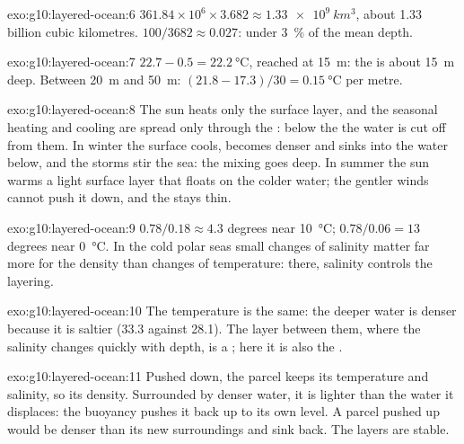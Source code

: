 \begin{solution}{exo:g10:layered-ocean:6}
$361.84\times10^6 \times 3.682 \approx \qty{1.33e9}{km^3}$, about
\num{1.33} billion cubic kilometres. $100/3682 \approx 0.027$: under
\qty{3}{\percent} of the mean depth.
\end{solution}

\begin{solution}{exo:g10:layered-ocean:7}
$22.7 - 0.5 = \qty{22.2}{\degreeCelsius}$, reached at \qty{15}{m}: the  is about \qty{15}{m} deep. Between \qty{20}{m} and \qty{50}{m}:
$(21.8 - 17.3)/30 = \qty{0.15}{\degreeCelsius}$ per metre.
\end{solution}

\begin{solution}{exo:g10:layered-ocean:8}
The sun heats only the surface layer, and the seasonal heating and cooling
are spread only through the : below the  the water is
cut off from them. In winter the surface cools, becomes denser and sinks into
the water below, and the storms stir the sea: the mixing goes deep. In summer
the sun warms a light surface layer that floats on the colder water; the
gentler winds cannot push it down, and the  stays thin.
\end{solution}

\begin{solution}{exo:g10:layered-ocean:9}
$0.78/0.18 \approx 4.3$ degrees near \qty{10}{\degreeCelsius};
$0.78/0.06 = 13$ degrees near \qty{0}{\degreeCelsius}. In the cold polar seas
small changes of salinity matter far more for the density than changes of
temperature: there, salinity controls the layering.
\end{solution}

\begin{solution}{exo:g10:layered-ocean:10}
The temperature is the same: the deeper water is denser because it is
saltier (33.3 against 28.1). The layer between them, where the salinity
changes quickly with depth, is a ; here it is also the .
\end{solution}

\begin{solution}{exo:g10:layered-ocean:11}
Pushed down, the parcel keeps its temperature and salinity, so its density.
Surrounded by denser water, it is lighter than the water it displaces: the
buoyancy pushes it back up to its own level. A parcel pushed up would be
denser than its new surroundings and sink back. The layers are stable.
\end{solution}

